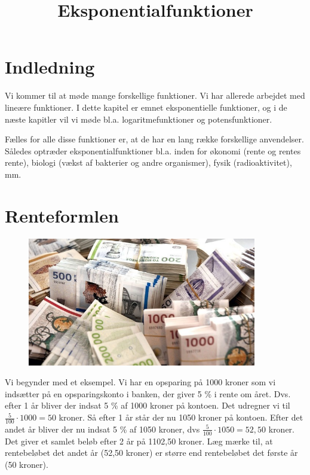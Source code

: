 \documentclass[12pt,oneside,a4paper]{article}
\title{Eksponentialfunktioner}
\date{\vspace{-5ex}}
\theoremstyle{plain}
\begin{document}
\maketitle

\section*{Indledning}
Vi kommer til at møde mange forskellige funktioner. Vi har allerede
arbejdet med lineære funktioner. I dette kapitel er emnet eksponentielle
funktioner, og i de næste kapitler vil vi møde bl.a. logaritmefunktioner og
potensfunktioner.

Fælles for alle disse funktioner er, at de har en lang række forskellige
anvendelser. Således optræder eksponentialfunktioner bl.a. inden for økonomi
(rente og rentes rente), biologi (vækst af bakterier og andre organismer),
fysik (radioaktivitet), mm.

\section*{Renteformlen}
\begin{figure}[ht]
    \centering
    \includegraphics[width=10cm]{penge}
\end{figure}

Vi begynder med et eksempel. Vi har en opsparing på 1000 kroner som vi
indsætter på en opsparingskonto i banken, der giver 5 \% i rente om året. Dvs.
efter 1 år bliver der indsat 5 \% af 1000 kroner på kontoen. Det
udregner vi til $ \frac{5}{100} \cdot 1000 = 50 $ kroner. Så efter 1 år står
der nu 1050 kroner på kontoen.  Efter det andet år bliver der nu indsat 5 \% af
1050 kroner, dvs $ \frac{5}{100} \cdot 1050 = 52,50$ kroner.
Det giver et samlet beløb efter 2 år på 1102,50 kroner. Læg mærke til, at
rentebeløbet det andet år (52,50 kroner) er større end rentebeløbet det første
år (50 kroner).
\end{document}
